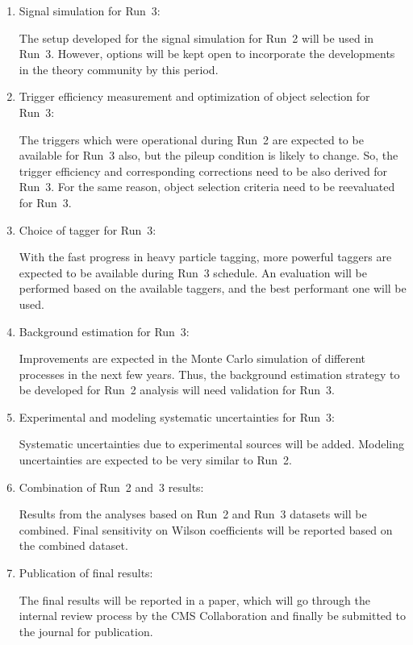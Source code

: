 \documentclass[a4paper,11pt]{article}
\begin{document}
\begin{enumerate}
\item Signal simulation for Run~3:

The setup developed for the signal simulation for Run~2 will be used in Run~3. However, options will be kept open to incorporate the developments in the theory community by this period. 

\item Trigger efficiency measurement and optimization of object selection for Run~3: 

The triggers which were operational during Run~2 are expected to be available for Run~3 also, but the pileup condition is likely to change. So, the trigger efficiency and corresponding corrections need to be also derived for Run~3. 
For the same reason, object selection criteria need to be reevaluated for Run~3. 

\item Choice of \PH tagger for Run~3:

With the fast progress in heavy particle tagging, more powerful taggers are expected to be available during Run~3 schedule. An evaluation will be performed based on the available taggers, and the best performant one will be used. 

\item Background estimation for Run~3:

Improvements are expected in the Monte Carlo simulation of different processes in the next few years. Thus, the background estimation strategy to be developed for Run~2 analysis will need validation for Run~3.

\item Experimental and modeling systematic uncertainties for Run~3:

Systematic uncertainties due to experimental sources will be added. Modeling uncertainties are expected to be very similar to Run~2.

\item Combination of Run~2 and~3 results:

Results from the analyses based on Run~2 and Run~3 datasets will be combined. Final sensitivity on Wilson coefficients will be reported based on the combined dataset. 

\item Publication of final results:

The final results will be reported in a paper, which will go through the internal review process by the CMS Collaboration and finally be submitted to the journal for publication. 

\end{enumerate}
\end{document}
